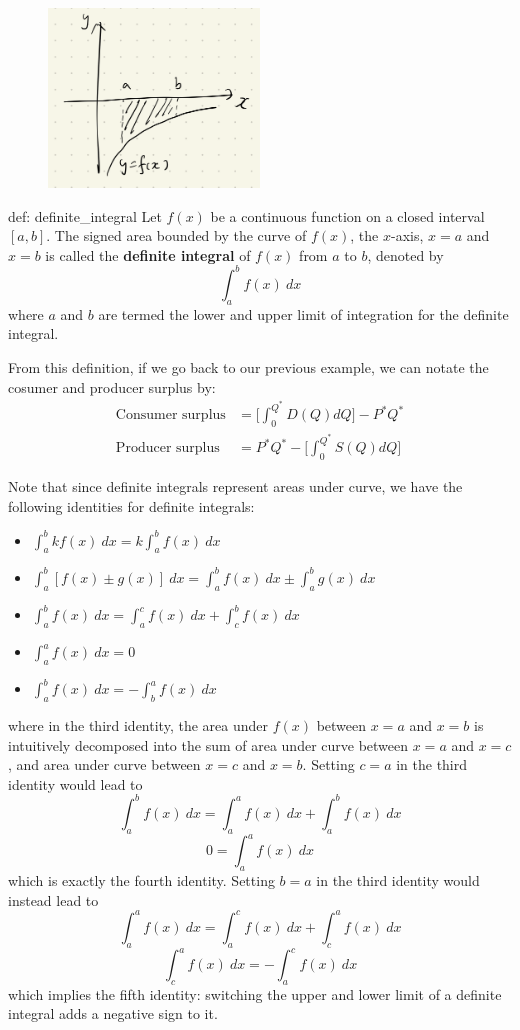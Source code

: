 \begin{figure}[ht]
    \centering
    \includegraphics[width = 0.5\textwidth]{figures/chap 07/signed_area.png}
\end{figure}

\begin{defi}{def: definite_integral}
    Let $f(x)$ be a continuous function on a closed interval $[a,b]$.  The signed area bounded by the curve of $f(x)$, the $x$-axis, $x=a$ and $x=b$ is called the \textbf{definite integral} of $f(x)$ from $a$ to $b$, denoted by
    \[\int_a^b f(x)~dx\]
    where $a$ and $b$ are termed the lower and upper limit of integration for the definite integral.
\end{defi}

From this definition, if we go back to our previous example, we can notate the cosumer and producer surplus by:
\begin{align*}
    \text{Consumer surplus} &= \Big[\int_0^{Q^*} D(Q) dQ\Big] - P^*Q^*\\
    \text{Producer surplus} &= P^*Q^* - \Big[\int_0^{Q^*} S(Q) dQ\Big]
\end{align*}

Note that since definite integrals represent areas under curve, we have the following identities for definite integrals:
\begin{itemize}
    \item $\int_a^b kf(x)~dx = k\int_a^b f(x)~dx$
    \item $\int_a^b [f(x) \pm g(x)]~dx = \int_a^b f(x)~dx \pm \int_a^b g(x)~dx$
    \item $\int_a^b f(x)~dx = \int_a^c f(x)~dx + \int_c^b f(x)~dx$
    \item $\int_a^a f(x)~dx = 0$
    \item $\int_a^b f(x)~dx = -\int_b^a f(x)~dx$
\end{itemize}
where in the third identity, the area under $f(x)$ between $x = a$ and $x = b$ is intuitively decomposed into the sum of area under curve between $x = a$ and $x = c$, and area under curve between $x = c$ and $x = b$.  Setting $c = a$ in the third identity would lead to 
\[\int_a^b f(x)~dx = \int_a^a f(x)~dx + \int_a^b f(x)~dx\]
\[0 = \int_a^a f(x)~dx\]
which is exactly the fourth identity.  Setting $b = a$ in the third identity would instead lead to
\[\int_a^a f(x)~dx = \int_a^c f(x)~dx + \int_c^a f(x)~dx\]
\[\int_c^a f(x)~dx = -\int_a^c f(x)~dx \]
which implies the fifth identity: switching the upper and lower limit of a definite integral adds a negative sign to it. 

